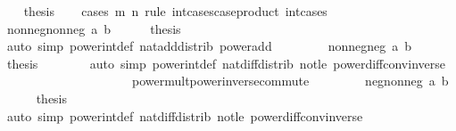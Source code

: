 \begin{isabellebody}
\ \ \isamarkupfalse%
\ {\isacharquery}{\kern0pt}thesis\isanewline
\ \ \isamarkupfalse%
\ {\isacharparenleft}{\kern0pt}cases\ m\ n\ rule{\isacharcolon}{\kern0pt}\ int{\isacharunderscore}{\kern0pt}cases{}{\isacharbrackleft}{\kern0pt}case{\isacharunderscore}{\kern0pt}product\ int{\isacharunderscore}{\kern0pt}cases{}{\isacharbrackright}{\kern0pt}{\isacharparenright}{\kern0pt}\isanewline
\ \ \ \ \isamarkupfalse%
\ {\isacharparenleft}{\kern0pt}nonneg{\isacharunderscore}{\kern0pt}nonneg\ a\ b{\isacharparenright}{\kern0pt}\isanewline
\ \ \ \ \isamarkupfalse%
\ {\isacharquery}{\kern0pt}thesis\isanewline
\ \ \ \ \ \ \isamarkupfalse%
\ {\isacharparenleft}{\kern0pt}auto\ simp{\isacharcolon}{\kern0pt}\ power{\isacharunderscore}{\kern0pt}int{\isacharunderscore}{\kern0pt}def\ nat{\isacharunderscore}{\kern0pt}add{\isacharunderscore}{\kern0pt}distrib\ power{\isacharunderscore}{\kern0pt}add{\isacharparenright}{\kern0pt}\isanewline
\ \ \isamarkupfalse%
\isanewline
\ \ \ \ \isamarkupfalse%
\ {\isacharparenleft}{\kern0pt}nonneg{\isacharunderscore}{\kern0pt}neg\ a\ b{\isacharparenright}{\kern0pt}\isanewline
\ \ \ \ \isamarkupfalse%
\ {\isacharquery}{\kern0pt}thesis\isanewline
\ \ \ \ \ \ \isamarkupfalse%
\ {\isacharparenleft}{\kern0pt}auto\ simp{\isacharcolon}{\kern0pt}\ power{\isacharunderscore}{\kern0pt}int{\isacharunderscore}{\kern0pt}def\ nat{\isacharunderscore}{\kern0pt}diff{\isacharunderscore}{\kern0pt}distrib\ not{\isacharunderscore}{\kern0pt}le\ power{\isacharunderscore}{\kern0pt}diff{\isacharunderscore}{\kern0pt}conv{\isacharunderscore}{\kern0pt}inverse\isanewline
\ \ \ \ \ \ \ \ \ \ \ \ \ \ \ \ \ \ \ \ \ power{\isacharunderscore}{\kern0pt}mult{\isacharunderscore}{\kern0pt}power{\isacharunderscore}{\kern0pt}inverse{\isacharunderscore}{\kern0pt}commute{\isacharparenright}{\kern0pt}\isanewline
\ \ \isamarkupfalse%
\isanewline
\ \ \ \ \isamarkupfalse%
\ {\isacharparenleft}{\kern0pt}neg{\isacharunderscore}{\kern0pt}nonneg\ a\ b{\isacharparenright}{\kern0pt}\isanewline
\ \ \ \ \isamarkupfalse%
\ {\isacharquery}{\kern0pt}thesis\isanewline
\ \ \ \ \ \ \isamarkupfalse%
\ {\isacharparenleft}{\kern0pt}auto\ simp{\isacharcolon}{\kern0pt}\ power{\isacharunderscore}{\kern0pt}int{\isacharunderscore}{\kern0pt}def\ nat{\isacharunderscore}{\kern0pt}diff{\isacharunderscore}{\kern0pt}distrib\ not{\isacharunderscore}{\kern0pt}le\ power{\isacharunderscore}{\kern0pt}diff{\isacharunderscore}{\kern0pt}conv{\isacharunderscore}{\kern0pt}inverse\isanewline

\end{isabellebody}

